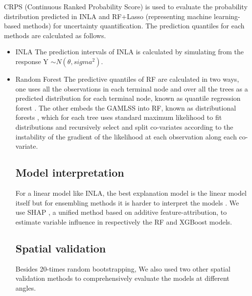 \documentclass{article}
\begin{document}
CRPS (Continuous Ranked Probability Score) \citep{jordan2017evaluating} is used to evaluate the probability distribution predicted in INLA and RF+Lasso (representing machine learning-based methods) for uncertainty quantification. The prediction quantiles for each methods are calculated as follows. %
\begin{itemize}
     
\item INLA
The prediction intervals of INLA is calculated by simulating from the response Y $\sim N(\theta, sigma^2)$.  


\item Random Forest 
 The predictive quantiles of RF are calculated in two ways, one uses all the observations in each terminal node and over all the trees as a predicted distribution for each terminal node, known as quantile regression forest \citep{meinshausen2006quantile}. The other embeds the GAMLSS \citep{stasinopoulos2007generalized} into RF, known as distributional forests \citep{schlosser2019distributional}, which for each tree uses standard maximum likelihood to fit distributions and recursively select and split co-variates according to the instability of the gradient of the likelihood at each observation along each co-variate. 
 
\subsection{Model interpretation}
For a linear model like INLA, the best explanation model is the linear model itself but for ensembling methods it is harder to interpret the models \citep{NIPS2017_8a20a862}. We use SHAP \citep[SHapley Additive exPlanations,][]{lundberg2018explainable,NIPS2017_8a20a862}, a unified method based on additive feature-attribution, to estimate variable influence in respectively the RF and XGBoost models.   

\subsection{Spatial validation}
Besides 20-times random bootstrapping, We also used two other spatial validation methods to comprehensively evaluate the models at different angles.


\end{itemize}
\end{document}
